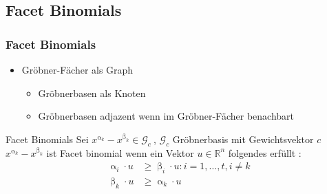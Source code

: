 \documentclass{beamer}
\begin{document}
\subsection{Facet Binomials}
\begin{frame}
\frametitle{Facet Binomials }

\begin{itemize}
\item Gröbner-Fächer als Graph
~\\
\begin{itemize}
\item Gröbnerbasen als Knoten
\item Gröbnerbasen adjazent wenn im Gröbner-Fächer benachbart
\end{itemize}
\end{itemize}

\begin{block}{Facet Binomials}
Sei $x^{\upalpha_{k}}-x^{\upbeta_k} \in \mathcal{G}_c~$, $\mathcal{G}_c$ Gröbnerbasis mit Gewichtsvektor $c$\\
$x^{\upalpha_{k}}-x^{\upbeta_k}$ ist Facet binomial wenn ein Vektor $u \in \mathbb{R}^{n}$ folgendes erfüllt : \\

\begin{align*}
   \upalpha_{i} \cdot u & \geq \upbeta_{i}  \cdot u : i = 1, \dots , t, i \neq k \\
   \upbeta_{k}  \cdot u & \geq \upalpha_{k}  \cdot u
\end{align*}


\end{block}

\end{frame}
\end{document}
